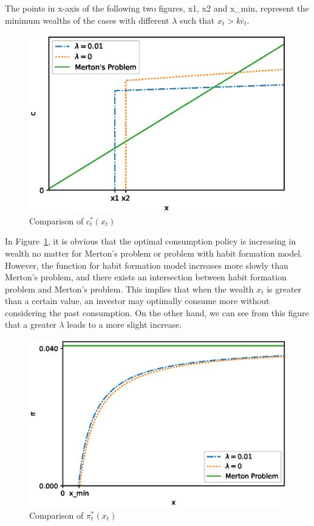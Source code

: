 \documentclass[a4paper]{article}
\theoremstyle{definition}
\numberwithin{equation}{section}
\begin{document}
The points in x-axis  of the following two figures, x1, x2 and x\_min, represent the minimum wealths of the cases with different $\lambda$ such that $x_t>k\overline c_t$.
\begin{figure}[H]
\centering
\includegraphics[scale=0.6]{Comparec.eps}
\caption{Comparison of $c^*_t(x_t)$}
\label{fig:CompareC}
\end{figure}
In Figure~\ref{fig:CompareC}, it is obvious that the optimal consumption policy is increasing in wealth no matter for Merton's problem or problem with habit formation model. However, the function for habit formation model increases more slowly than Merton's problem, and there exists an intersection between habit formation problem and Merton's problem. This implies that when the wealth $x_t$ is greater than a certain value, an investor may optimally consume more without considering the past consumption. On the other hand, we can see from this figure that a greater $\lambda$ leads to a more slight increase. 
\begin{figure}[H]
\centering
\includegraphics[scale=0.6]{Comparepi.eps}
\caption{Comparison of $\pi^*_t(x_t)$}
\label{fig:ComparePi}
\end{figure}
\end{document}

